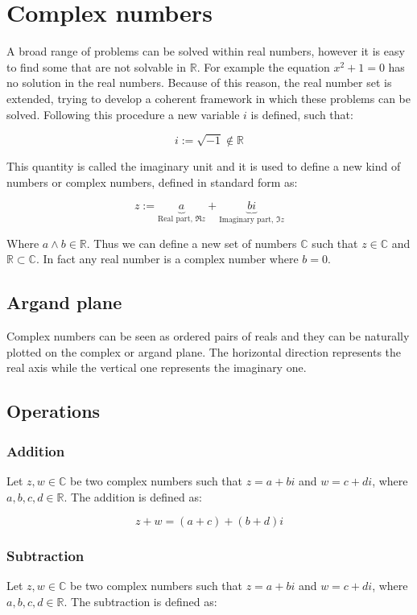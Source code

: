 \chapter{Complex numbers}
A broad range of problems can be solved within real numbers, however it is easy to find some that are not solvable in $\mathbb{R}$.
For example the equation $x^2+1=0$ has no solution in the real numbers.
Because of this reason, the real number set is extended, trying to develop a coherent framework in which these problems can be solved.
Following this procedure a new variable $i$ is defined, such that:

$$i := \sqrt{-1}\not\in\mathbb{R}$$

This quantity is called the imaginary unit and it is used to define a new kind of numbers or complex numbers, defined in standard form as:

$$z := \underbrace{a}_{\text{Real part, }\Re{z}} + \underbrace{bi}_{\text{Imaginary part, }\Im{z}}$$

Where $a\land b\in\mathbb{R}$.
Thus we can define a new set of numbers $\mathbb{C}$ such that $z\in\mathbb{C}$ and $\mathbb{R}\subset\mathbb{C}$.
In fact any real number is a complex number where $b=0$.

\section{Argand plane}
Complex numbers can be seen as ordered pairs of reals and they can be naturally plotted on the complex or argand plane.
The horizontal direction represents the real axis while the vertical one represents the imaginary one.

\section{Operations}

	\subsection{Addition}
	Let $z, w\in\mathbb{C}$ be two complex numbers such that $z = a+bi$ and $w = c+di$, where $a,b,c,d\in\mathbb{R}$.
	The addition is defined as:

	$$z+w = (a+c) + (b+d)i$$

	\subsection{Subtraction}
	Let $z, w\in\mathbb{C}$ be two complex numbers such that $z = a+bi$ and $w = c+di$, where $a,b,c,d\in\mathbb{R}$.
	The subtraction is defined as:

